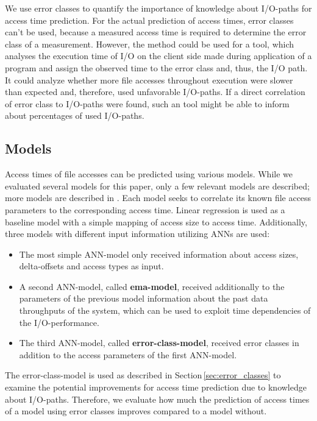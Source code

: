 \documentclass{superfri}
\begin{document}
\medskip

We use error classes to quantify the importance of knowledge about I/O-paths for access time prediction. 
For the actual prediction of access times, error classes can't be used, because a measured access time is required to determine the error class of a measurement.
However, the method could be used for a tool, which analyses the execution time of I/O on the client side made during application of a program and assign the observed time to the error class and, thus, the I/O path. 
It could analyze whether more file accesses throughout execution were slower than expected and, therefore, used unfavorable I/O-paths.
If a direct correlation of error class to I/O-paths were found, such an tool might be able to inform about percentages of used I/O-paths.

\subsection{Models}
Access times of file accesses can be predicted using various models.
While we evaluated several models for this paper, only a few relevant models are described; more models are described in \cite{VVEIHUDVVN15}. 
Each model seeks to correlate its known file access parameters to the corresponding access time. 
Linear regression is used as a baseline model with a simple mapping of access size to access time.
Additionally, three models with different input information utilizing ANNs are used:
\begin{itemize}
	\item The most simple ANN-model only received information about access sizes, delta-offsets and access types as input.
	\item A second ANN-model, called \textbf{ema-model}, received additionally to the parameters of the previous model information about the past data throughputs of the system, which can be used to exploit time dependencies of the I/O-performance.
	\item The third ANN-model, called \textbf{error-class-model}, received error classes in addition to the access parameters of the first ANN-model.
\end{itemize}\medskip

The error-class-model is used as described in Section\,\ref{sec:error_classes} to examine the potential improvements for access time prediction due to knowledge about I/O-paths.
Therefore, we evaluate how much the prediction of access times of a model using error classes improves compared to a model without.
\end{document}
